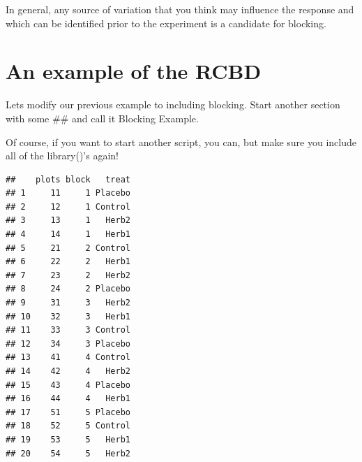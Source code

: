 \documentclass[
]{book}
\newenvironment{Shaded}{\begin{snugshade}}{\end{snugshade}}
\newcommand{\AttributeTok}[1]{\textcolor[rgb]{0.77,0.63,0.00}{#1}}
\newcommand{\CommentTok}[1]{\textcolor[rgb]{0.56,0.35,0.01}{\textit{#1}}}
\newcommand{\DecValTok}[1]{\textcolor[rgb]{0.00,0.00,0.81}{#1}}
\newcommand{\FunctionTok}[1]{\textcolor[rgb]{0.00,0.00,0.00}{#1}}
\newcommand{\NormalTok}[1]{#1}
\newcommand{\OtherTok}[1]{\textcolor[rgb]{0.56,0.35,0.01}{#1}}
\newcommand{\SpecialCharTok}[1]{\textcolor[rgb]{0.00,0.00,0.00}{#1}}
\newcommand{\StringTok}[1]{\textcolor[rgb]{0.31,0.60,0.02}{#1}}
\begin{document}
In general, any source of variation that you think may influence the response and which can be identified prior to the experiment is a candidate for blocking.

\hypertarget{an-example-of-the-rcbd}{%
\section{An example of the RCBD}\label{an-example-of-the-rcbd}}

Lets modify our previous example to including blocking. Start another section with some \#\# and call it Blocking Example.

Of course, if you want to start another script, you can, but make sure you include all of the library()'s again!

\begin{Shaded}
\end{Shaded}

\begin{verbatim}
##    plots block   treat
## 1     11     1 Placebo
## 2     12     1 Control
## 3     13     1   Herb2
## 4     14     1   Herb1
## 5     21     2 Control
## 6     22     2   Herb1
## 7     23     2   Herb2
## 8     24     2 Placebo
## 9     31     3   Herb2
## 10    32     3   Herb1
## 11    33     3 Control
## 12    34     3 Placebo
## 13    41     4 Control
## 14    42     4   Herb2
## 15    43     4 Placebo
## 16    44     4   Herb1
## 17    51     5 Placebo
## 18    52     5 Control
## 19    53     5   Herb1
## 20    54     5   Herb2
\end{verbatim}
\end{document}

